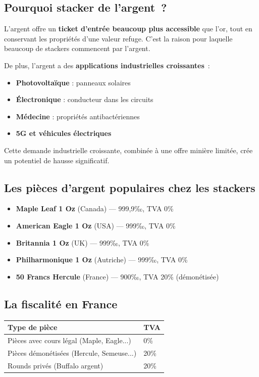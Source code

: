 \documentclass[14pt,a4paper]{extarticle}
\newcommand{\permil}{‰}
\begin{document}
\subsection{Pourquoi stacker de l'argent~?}

L'argent offre un \textbf{ticket d'entrée beaucoup plus accessible} que l'or, tout en conservant les propriétés d'une valeur refuge. C'est la raison pour laquelle beaucoup de stackers commencent par l'argent.

De plus, l'argent a des \textbf{applications industrielles croissantes}~:
\begin{itemize}
  \item \textbf{Photovoltaïque} : panneaux solaires
  \item \textbf{Électronique} : conducteur dans les circuits
  \item \textbf{Médecine} : propriétés antibactériennes
  \item \textbf{5G et véhicules électriques}
\end{itemize}

Cette demande industrielle croissante, combinée à une offre minière limitée, crée un potentiel de hausse significatif.

\subsection{Les pièces d'argent populaires chez les stackers}

\begin{itemize}
  \item \textbf{Maple Leaf 1 Oz} (Canada) --- 999,9\permil{}, TVA 0\%
  \item \textbf{American Eagle 1 Oz} (USA) --- 999\permil{}, TVA 0\%
  \item \textbf{Britannia 1 Oz} (UK) --- 999\permil{}, TVA 0\%
  \item \textbf{Philharmonique 1 Oz} (Autriche) --- 999\permil{}, TVA 0\%
  \item \textbf{50 Francs Hercule} (France) --- 900\permil{}, TVA 20\% (démonétisée)
\end{itemize}

\subsection{La fiscalité en France}

\begin{center}
\begin{tabular}{|l|l|}
\hline
\rowcolor{gold!20} \textbf{Type de pièce} & \textbf{TVA} \\
\hline
Pièces avec cours légal (Maple, Eagle...) & 0\% \\
\hline
Pièces démonétisées (Hercule, Semeuse...) & 20\% \\
\hline
Rounds privés (Buffalo argent) & 20\% \\
\hline
\end{tabular}
\end{center}
\end{document}
